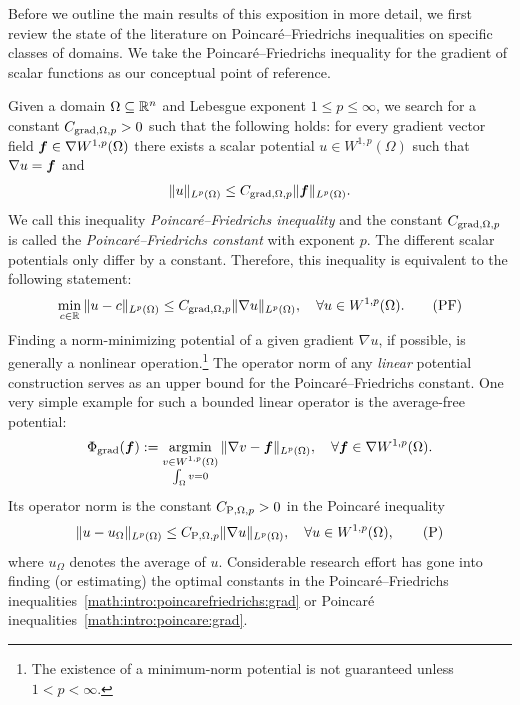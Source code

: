 \documentclass[10pt,a4paper]{article}
\begin{document}
Before we outline the main results of this exposition in more detail, 
we first review the state of the literature on Poincar\'e--Friedrichs inequalities on specific classes of domains. 
We take the Poincar\'e--Friedrichs inequality for the gradient of scalar functions as our conceptual point of reference.

Given a domain $\Omega \subseteq {\mathbb R}^{n}$ and Lebesgue exponent $1 \leq p \leq \infty$,
we search for a constant $C_{\operatorname{grad},\Omega,p} > 0$ such that the following holds:
for every gradient vector field $\bm{f} \in \nabla W^{1,p}(\Omega)$ there exists a scalar potential $u \in W^{1,p}(\Omega)$
such that $\nabla u = \bm{f}$ and 
\begin{align}\label{math:intro:inequalitypf:gradient} 
    \| u \|_{L^{p}(\Omega)}
    \leq 
    C_{\operatorname{grad},\Omega,p} 
    \| \bm{f} \|_{L^{p}(\Omega)}
    .
\end{align}
We call this inequality \emph{Poincar\'e--Friedrichs inequality} and the constant $C_{\operatorname{grad},\Omega,p}$ is called the \emph{Poincar\'e--Friedrichs constant} with exponent $p$. 
The different scalar potentials only differ by a constant. 
Therefore, 
this inequality is equivalent to the following statement: 
\begin{align}\label{math:intro:poincarefriedrichs:grad}
    \min\limits_{c\in\bbR}
    \| u - c \|_{L^{p}(\Omega)}
    \leq 
    C_{\grad,\Omega,p} \| \nabla u \|_{L^{p}(\Omega)},
    \quad 
    \forall
    u \in W^{1,p}(\Omega) %
    .\tag{PF} 
\end{align}
Finding a norm-minimizing potential of a given gradient $\nabla u$, if possible, is generally a nonlinear operation.\footnote{The existence of a minimum-norm potential is not guaranteed unless $1 < p < \infty$.}
The operator norm of any \emph{linear} potential construction serves as an upper bound for the Poincar\'e--Friedrichs constant. 
One very simple example for such a bounded linear operator is the average-free potential: %
\begin{align*}
    \Phi_{\operatorname{grad}}( \bm{f} ) 
    := 
    \operatorname*{{\rm argmin}}\limits_{ \substack{ v \in W^{1,p}(\Omega) \\ \int_\Omega v = 0 } } \| \nabla v - \bm{f} \|_{L^{p}(\Omega)},
    \quad 
    \forall 
    \bm{f} \in \nabla W^{1,p}(\Omega)
    .
\end{align*} 
Its operator norm is the constant $C_{{\rm P},\Omega,p} > 0$ in the Poincar\'e inequality 
\begin{align}\label{math:intro:poincare:grad}
    \| u - u_{\Omega} \|_{L^{p}(\Omega)}
    \leq 
    C_{{\rm P},\Omega,p} \| \nabla u \|_{L^{p}(\Omega)},
    \quad 
    \forall 
    u \in W^{1,p}(\Omega)
    , \tag{P} 
\end{align}
where $u_\Omega$ denotes the average of $u$.
Considerable research effort has gone into finding (or estimating) the optimal constants in the Poincar\'e--Friedrichs inequalities~\eqref{math:intro:poincarefriedrichs:grad} or Poincar\'e inequalities~\eqref{math:intro:poincare:grad}. 
\end{document}
